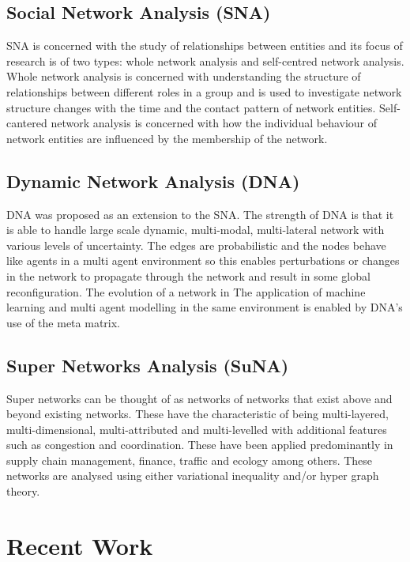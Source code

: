 \subsection{Social Network Analysis (SNA)}

SNA is concerned with the study of relationships between entities and its focus of research is of two types: whole network analysis and self-centred network analysis. Whole network analysis is concerned with understanding the structure of relationships between different roles in a group and is used to investigate network structure changes with the time and the contact pattern of network entities. Self-cantered network analysis is concerned with how the individual behaviour of network entities are influenced by the membership of the network. \cite{Chapanond2005}

\subsection{Dynamic Network Analysis (DNA)}

DNA was proposed as an extension to the SNA. The strength of DNA is that it is able to handle large scale dynamic, multi-modal, multi-lateral network with various levels of uncertainty. The edges are probabilistic and the nodes behave like agents in a multi agent environment so this enables perturbations or changes in the network to propagate through the network and result in some global reconfiguration. The evolution of a network in The application of machine learning and multi agent modelling in the same environment is enabled by DNA’s use of the meta matrix.\cite{Chapanond2005} 

\subsection{Super Networks Analysis (SuNA)}

Super networks can be thought of as networks of networks that exist above and beyond existing networks. These have the characteristic of being multi-layered, multi-dimensional, multi-attributed and multi-levelled with additional features such as congestion and coordination. These have been applied predominantly in supply chain management, finance, traffic and ecology among others. These networks are analysed using either variational inequality and/or hyper graph theory. \cite{Chapanond2005}

\section{Recent Work}

